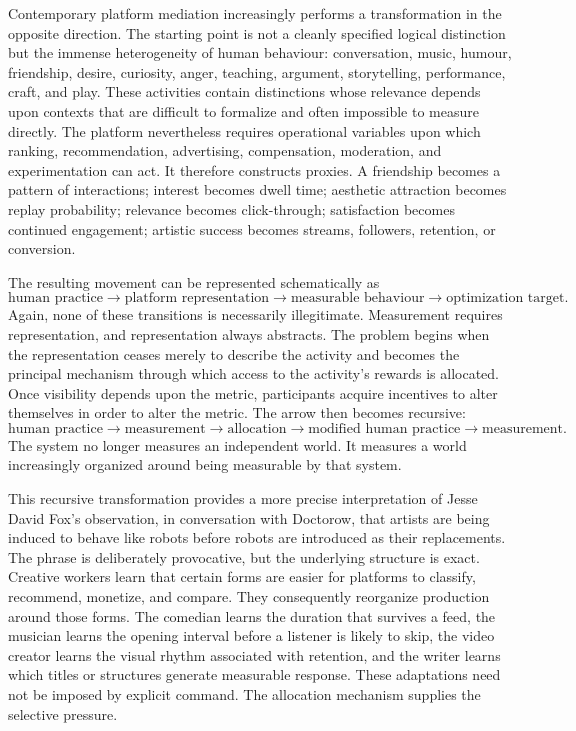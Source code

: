 \documentclass[11pt]{article}
\begin{document}
Contemporary platform mediation increasingly performs a transformation in the opposite direction. The starting point is not a cleanly specified logical distinction but the immense heterogeneity of human behaviour: conversation, music, humour, friendship, desire, curiosity, anger, teaching, argument, storytelling, performance, craft, and play. These activities contain distinctions whose relevance depends upon contexts that are difficult to formalize and often impossible to measure directly. The platform nevertheless requires operational variables upon which ranking, recommendation, advertising, compensation, moderation, and experimentation can act. It therefore constructs proxies. A friendship becomes a pattern of interactions; interest becomes dwell time; aesthetic attraction becomes replay probability; relevance becomes click-through; satisfaction becomes continued engagement; artistic success becomes streams, followers, retention, or conversion.

The resulting movement can be represented schematically as
\[
\text{human practice}
\longrightarrow
\text{platform representation}
\longrightarrow
\text{measurable behaviour}
\longrightarrow
\text{optimization target}.
\]
Again, none of these transitions is necessarily illegitimate. Measurement requires representation, and representation always abstracts. The problem begins when the representation ceases merely to describe the activity and becomes the principal mechanism through which access to the activity's rewards is allocated. Once visibility depends upon the metric, participants acquire incentives to alter themselves in order to alter the metric. The arrow then becomes recursive:
\[
\text{human practice}
\longrightarrow
\text{measurement}
\longrightarrow
\text{allocation}
\longrightarrow
\text{modified human practice}
\longrightarrow
\text{measurement}.
\]
The system no longer measures an independent world. It measures a world increasingly organized around being measurable by that system.

This recursive transformation provides a more precise interpretation of Jesse David Fox's observation, in conversation with Doctorow, that artists are being induced to behave like robots before robots are introduced as their replacements. The phrase is deliberately provocative, but the underlying structure is exact. Creative workers learn that certain forms are easier for platforms to classify, recommend, monetize, and compare. They consequently reorganize production around those forms. The comedian learns the duration that survives a feed, the musician learns the opening interval before a listener is likely to skip, the video creator learns the visual rhythm associated with retention, and the writer learns which titles or structures generate measurable response. These adaptations need not be imposed by explicit command. The allocation mechanism supplies the selective pressure.
\end{document}
